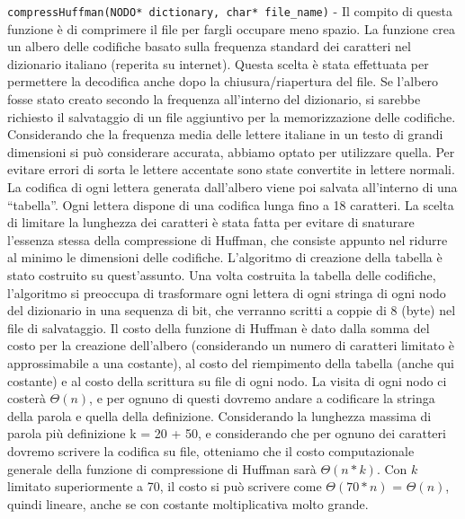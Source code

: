 \documentclass[paper=a4, fontsize=11pt,twoside]{scrartcl}   %
\begin{document}
				\texttt{compressHuffman(NODO* dictionary, char* file\_name)} - Il compito di questa funzione è di comprimere il file per fargli occupare meno spazio. La funzione crea un albero delle codifiche basato sulla frequenza standard dei caratteri nel dizionario italiano (reperita su internet). Questa scelta è stata effettuata per permettere la decodifica anche dopo la chiusura/riapertura del file. Se l’albero fosse stato creato secondo la frequenza all’interno del dizionario, si sarebbe richiesto il salvataggio di un file aggiuntivo per la memorizzazione delle codifiche. Considerando che la frequenza media delle lettere italiane in un testo di grandi dimensioni si può considerare accurata, abbiamo optato per utilizzare quella. Per evitare errori di sorta le lettere accentate sono state convertite in lettere normali.
				La codifica di ogni lettera generata dall’albero viene poi salvata all’interno di una “tabella”. Ogni lettera dispone di una codifica lunga fino a 18 caratteri. La scelta di limitare la lunghezza dei caratteri è stata fatta per evitare di snaturare l’essenza stessa della compressione di Huffman, che consiste appunto nel ridurre al minimo le dimensioni delle codifiche. L’algoritmo di creazione della tabella è stato costruito su quest’assunto. 
				Una volta costruita la tabella delle codifiche, l’algoritmo si preoccupa di trasformare ogni lettera di ogni stringa di ogni nodo del dizionario in una sequenza di bit, che verranno scritti a coppie di 8 (byte) nel file di salvataggio. 
				Il costo della funzione di Huffman è dato dalla somma del costo per la creazione dell’albero (considerando un numero di caratteri limitato è approssimabile a una costante), al costo del riempimento della tabella (anche qui costante) e al costo della scrittura su file di ogni nodo. La visita di ogni nodo ci costerà $\Theta(n)$, e per ognuno di questi dovremo andare a codificare la stringa della parola e quella della definizione. Considerando la lunghezza massima di parola più definizione k = 20 + 50, e considerando che per ognuno dei caratteri dovremo scrivere la codifica su file, otteniamo che il costo computazionale generale della funzione di compressione di Huffman sarà $\Theta(n*k)$. Con $k$ limitato superiormente a 70, il costo si può scrivere come $\Theta(70*n)$ = $\Theta(n)$, quindi lineare, anche se con costante moltiplicativa molto grande.\par 
				
\end{document}
